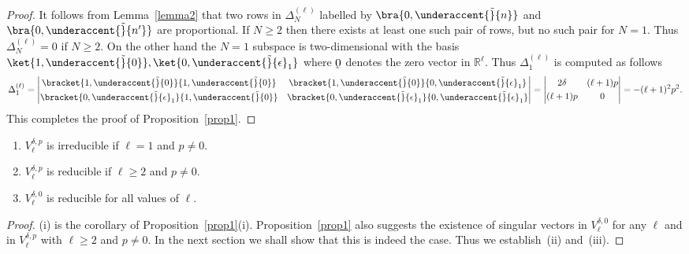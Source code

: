 \begin{proof}
It follows from Lemma~\ref{lemma2} that two rows in $ \Delta^{(\ell)}_N $ labelled by $ \bra{0,\underaccent{\tilde}{n}}
$ and $ \bra{0,\underaccent{\tilde}{n'}} $ are proportional.
If $ N \geq 2 $ then there exists at least one such pair of rows, but no such pair for $N = 1$.
Thus $ \Delta^{(\ell)}_N = 0 $ if $ N \geq 2$.
On the other hand the $ N = 1 $ subspace is two-dimensional with the basis $ \ket{1, \underaccent{\tilde}{0}}, \ket{0,
\underaccent{\tilde}{\epsilon}_1} $ where $\underaccent{\tilde}{0}$ denotes the zero vector in ${\mathbb R}^{\ell}$.
Thus $ \Delta^{(\ell)}_1 $ is computed as follows
\begin{gather*}
\Delta^{(\ell)}_1 = \left|
\begin{matrix} \bracket{1, \underaccent{\tilde}{0}}{1, \underaccent{\tilde}{0}} & \bracket{1, \underaccent{\tilde}{0}}{0,
\underaccent{\tilde}{\epsilon}_1}
\vspace{1mm}\\  \bracket{0, \underaccent{\tilde}{\epsilon}_1}{1, \underaccent{\tilde}{0}} & \bracket{0,
\underaccent{\tilde}{\epsilon}_1}{0, \underaccent{\tilde}{\epsilon}_1}
\end{matrix}
\right| = \left|
\begin{matrix} 2 \delta & (\ell+1)p
\vspace{1mm}\\  (\ell+1)p & 0
\end{matrix}
\right| = - (\ell+1)^2   p^2   .
\end{gather*}
This completes the proof of Proposition~\ref{prop1}.
\end{proof}



\begin{proposition}\qquad
\label{prop2}
\begin{enumerate}\itemsep=0pt
\item[$i)$] $ V^{\delta,p}_{\ell} $ is irreducible if $ \ell = 1 $ and $ p \neq 0$.
\item[$ii)$] $ V^{\delta,p}_{\ell} $ is reducible if $ \ell \geq 2 $ and $ p \neq 0$.
\item[$iii)$] $ V^{\delta,0}_{\ell} $ is reducible for all values of $ \ell$.
\end{enumerate}
\end{proposition}



\begin{proof}
(i) is the corollary of Proposition~\ref{prop1}(i).
Proposition~\ref{prop1} also suggests the existence of singular vectors in $V^{\delta,0}_{\ell} $ for any $\ell$ and
in $V^{\delta,p}_{\ell}$ with $\ell \geq 2$ and $p \neq 0$.
In the next section we shall show that this is indeed the case.
Thus we establish~(ii) and~(iii).
\end{proof}

